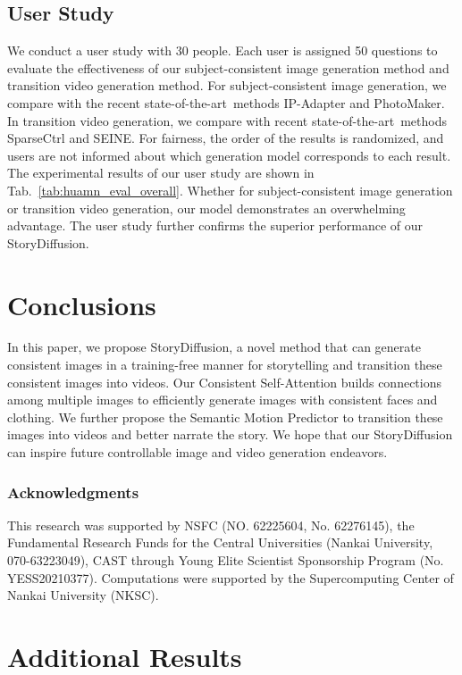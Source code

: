 \documentclass{article} %
\newcommand{\nameofmethod}{StoryDiffusion}
\newcommand{\nameofsa}{Consistent Self-Attention}
\newcommand{\nameofmm}{Semantic Motion Predictor}
\newcommand{\tabref}[1]{Tab.~\ref{#1}}
\newcommand{\sArt}{state-of-the-art~}
\begin{document}
\subsection{User Study}
We conduct a user study with 30 people. Each user is assigned 50 questions to evaluate the effectiveness of our subject-consistent image generation method and transition video generation method. For subject-consistent image generation, we compare with the recent \sArt methods IP-Adapter and PhotoMaker. In transition video generation, we compare with recent \sArt methods SparseCtrl and SEINE.
%
For fairness, the order of the results is randomized, and users are not informed about which generation model corresponds to each result. The experimental results of our user study are shown in \tabref{tab:huamn_eval_overall}.  Whether for subject-consistent image generation or transition video generation, our model demonstrates an overwhelming advantage. The user study further confirms the superior performance of our \nameofmethod{}.

\section{Conclusions}
In this paper, we propose \nameofmethod{}, a novel method that can generate consistent images in a training-free manner for storytelling and transition these consistent images into videos. Our \nameofsa{} builds connections among multiple images to efficiently generate images with consistent faces and clothing. We further propose the \nameofmm{} to transition these images into videos and better narrate the story. 
We hope that our \nameofmethod{} can inspire future controllable image and video generation endeavors.

\subsubsection*{Acknowledgments}
This research was supported by NSFC (NO. 62225604, No. 62276145), the Fundamental Research Funds for the Central Universities (Nankai University, 070-63223049), CAST through
Young Elite Scientist Sponsorship Program (No. YESS20210377). Computations were supported by the Supercomputing Center of Nankai University (NKSC). 





\appendix
\section{Additional Results}
\end{document}
